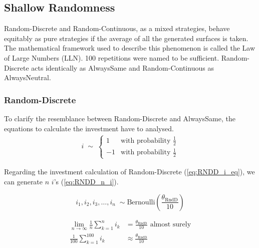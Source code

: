 \documentclass{article}
\begin{document}
\subsection{Shallow Randomness} \label{sec:shallow_randomness}

	Random-Discrete and Random-Continuous, as a mixed strategies, behave equitably as pure strategies if the average of all the generated surfaces is taken.
	The mathematical framework used to describe this phenomenon is called the Law of Large Numbers (LLN).
	100 repetitions were named to be sufficient.
	Random-Discrete acts identically as AlwaysSame and Random-Continuous as AlwaysNeutral.

\subsubsection*{Random-Discrete}
		
	To clarify the resemblance between Random-Discrete and AlwaysSame, the equations to calculate the investment have to analysed.
	\begin{equation}
		\begin{split}
		i \;\sim\;
		\begin{cases}
		  1 & \text{with probability } \frac{1}{2}\\
		 -1 & \text{with probability } \frac{1}{2} 
		\end{cases}
		\label{eq:RNDD_i_eq}
		\end{split}
	\end{equation}

	Regarding the investment calculation of Random-Discrete (\ref{eq:RNDD_i_eq}), we can generate $n$ $i$'s (\ref{eq:RNDD_n_i}).

	\begin{equation}
		i_1, i_2, i_3, \dots, i_n \;\sim \mathrm{Bernoulli}(\frac{\theta_{\mathrm{RndD}}}{10})
		\label{eq:RNDD_n_i}
	\end{equation}

	\begin{equation}
		\begin{split}
			\lim_{n\to\infty} \frac{1}{n} \sum_{k=1}^{n} i_k &= \frac{\theta_{\mathrm{RndD}}}{10} \text{ almost surely}\\
			\frac{1}{100} \sum_{k=1}^{100} i_k &\approx \frac{\theta_{\mathrm{RndD}}}{10}
		\label{eq:RNDD_approx_eq}
		\end{split}
	\end{equation}
\end{document}
